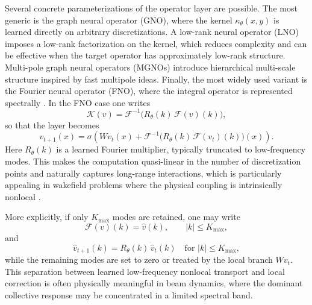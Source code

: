 \documentclass[11pt,a4paper]{article}
\begin{document}
\begin{sloppypar}
Several concrete parameterizations of the operator layer are possible. The most generic is the graph neural operator (GNO), where the kernel \(\kappa_\theta(x,y)\) is learned directly on arbitrary discretizations. A low-rank neural operator (LNO) imposes a low-rank factorization on the kernel, which reduces complexity and can be effective when the target operator has approximately low-rank structure. Multi-pole graph neural operators (MGNOs) introduce hierarchical multi-scale structure inspired by fast multipole ideas. Finally, the most widely used variant is the Fourier neural operator (FNO), where the integral operator is represented spectrally \cite{kovachki_neural_nodate}. In the FNO case one writes
\begin{equation}
\mathcal K(v)
=
\mathcal F^{-1}\!\bigl(
R_{\theta}(k)\,\mathcal F(v)(k)
\bigr),
\label{eq:FNO_core}
\end{equation}
so that the layer becomes
\begin{equation}
v_{t+1}(x)
=
\sigma\!\left(
Wv_t(x)
+
\mathcal F^{-1}\!\bigl(
R_{\theta}(k)\,\mathcal F(v_t)(k)
\bigr)(x)
\right).
\label{eq:FNO_layer}
\end{equation}
Here \(R_\theta(k)\) is a learned Fourier multiplier, typically truncated to low-frequency modes. This makes the computation quasi-linear in the number of discretization points and naturally captures long-range interactions, which is particularly appealing in wakefield problems where the physical coupling is intrinsically nonlocal \cite{kovachki_neural_nodate,kossaifi_library_2026}.

More explicitly, if only \(K_{\max}\) modes are retained, one may write
\begin{equation}
\mathcal F(v)(k) = \hat v(k), \qquad |k|\le K_{\max},
\end{equation}
and
\begin{equation}
\hat v_{t+1}(k)
=
R_\theta(k)\,\hat v_t(k)
\quad\text{for } |k|\le K_{\max},
\end{equation}
while the remaining modes are set to zero or treated by the local branch \(Wv_t\). This separation between learned low-frequency nonlocal transport and local correction is often physically meaningful in beam dynamics, where the dominant collective response may be concentrated in a limited spectral band.


\end{sloppypar}
\end{document}
